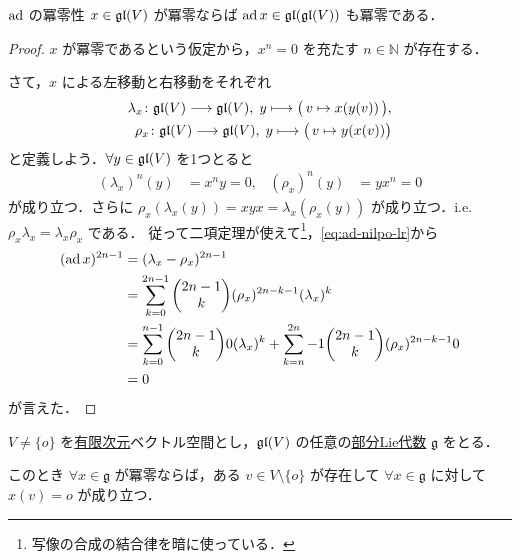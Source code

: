 \documentclass[rep_main]{subfiles}
\begin{document}
\begin{mylem}[label=lem:ad-nilpo]{$\operatorname{ad}$ の冪零性}
    $x \in \mathfrak{gl} (V)$ が冪零ならば $\operatorname{ad} x \in \mathfrak{gl} (\mathfrak{gl} (V))$ も冪零である．
\end{mylem}

\begin{proof}
    $x$ が冪零であるという仮定から，$x^n = 0$ を充たす $n \in \mathbb{N}$ が存在する． 
    
    さて，$x$ による左移動と右移動をそれぞれ
    \begin{align}
        \lambda_x \colon \mathfrak{gl} (V) \longrightarrow \mathfrak{gl} (V),\; y \longmapsto \bigl(\, v \mapsto x (y(v))\,\bigr), \\
        \rho_x \colon \mathfrak{gl} (V) \longrightarrow \mathfrak{gl} (V),\; y \longmapsto \bigl(\, v \mapsto y(x(v)) \bigr)
    \end{align}
    と定義しよう．$\forall y \in \mathfrak{gl} (V)$ を1つとると
    \begin{align}
        \label{eq:ad-nilpo-lr}
        (\lambda_x)^n (y) &= x^n y = 0, &
        (\rho_x)^n (y) &= y x^n = 0
    \end{align}
    が成り立つ．さらに $\rho_x (\lambda_x (y)) = xyx = \lambda_x (\rho_x (y))$ が成り立つ．i.e. $\rho_x \lambda_x = \lambda_x \rho_x$ である．
    従って二項定理が使えて\footnote{写像の合成の結合律を暗に使っている．}，\eqref{eq:ad-nilpo-lr}から
    \begin{align}
        (\ad x)^{2n-1} &= (\lambda_x - \rho_x)^{2n-1} \\
        &= \sum_{k=0}^{2n-1} \mqty(2n-1 \\ k) (\rho_x)^{2n-k-1} (\lambda_x)^{k} \\ 
        &= \sum_{k=0}^{n-1} \mqty(2n-1 \\ k) 0 (\lambda_x)^k + \sum_{k=n}^{2n}-1 \mqty(2n-1 \\ k) (\rho_x)^{2n - k - 1} 0 \\
        &= 0
    \end{align}
    が言えた．
\end{proof}


\begin{mylem}[label=lem:eigen]{}
    $V \neq \{o\}$ を\underline{有限次元}ベクトル空間とし，$\mathfrak{gl} (V)$ の任意の\hyperref[def:subLieAlg]{部分Lie代数} $\mathfrak{g}$ をとる．

    このとき $\forall x \in \mathfrak{g}$ が冪零ならば，ある $v \in V \setminus \{o\}$ が存在して $\forall x \in \mathfrak{g}$ に対して $x(v) = o$ が成り立つ．
\end{mylem}
\end{document}
